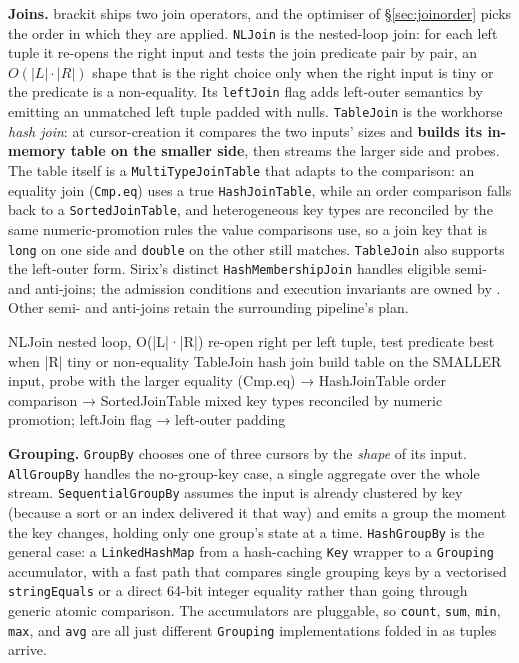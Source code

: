 \documentclass[11pt,a4paper,oneside]{report}
\newcommand{\dcap}[1]{\par\vspace{1pt}\noindent{\small\sffamily\bfseries\color{slate}#1}\par\vspace{-2pt}}
\theoremstyle{sirixthm}
\newcommand{\code}[1]{\texttt{#1}}
\begin{document}
\textbf{Joins.} brackit ships two join operators, and the optimiser of \S\ref{sec:joinorder} picks the
order in which they are applied. \code{NLJoin} is the nested-loop join: for each left tuple it re-opens
the right input and tests the join predicate pair by pair, an $O(\lvert L\rvert\cdot\lvert R\rvert)$ shape
that is the right choice only when the right input is tiny or the predicate is a non-equality. Its
\code{leftJoin} flag adds left-outer semantics by emitting an unmatched left tuple padded with nulls.
\code{TableJoin} is the workhorse \emph{hash join}: at cursor-creation it compares the two inputs' sizes
and \textbf{builds its in-memory table on the smaller side}, then streams the larger side and probes.
The table itself is a \code{MultiTypeJoinTable} that adapts to the comparison: an equality join
(\code{Cmp.eq}) uses a true \code{HashJoinTable}, while an order comparison falls back to a
\code{SortedJoinTable}, and heterogeneous key types are reconciled by the same numeric-promotion rules
the value comparisons use, so a join key that is \code{long} on one side and \code{double} on the other
still matches. \code{TableJoin} also supports the left-outer form. Sirix's distinct
\code{HashMembershipJoin} handles eligible semi- and anti-joins; the admission conditions and
execution invariants are owned by . Other semi- and
anti-joins retain the surrounding pipeline's plan.

\dcap{The two Brackit join operators and when each is chosen}
\begin{diagramS}
NLJoin     nested loop, O(|L|·|R|)   re-open right per left tuple, test predicate   best when |R| tiny or non-equality
TableJoin  hash join                 build table on the SMALLER input, probe with the larger
           equality (Cmp.eq)  → HashJoinTable        order comparison → SortedJoinTable
           mixed key types reconciled by numeric promotion;  leftJoin flag → left-outer padding
\end{diagramS}

\textbf{Grouping.} \code{GroupBy} chooses one of three cursors by the \emph{shape} of its input.
\code{AllGroupBy} handles the no-group-key case, a single aggregate over the whole stream.
\code{SequentialGroupBy} assumes the input is already clustered by key (because a sort or an index
delivered it that way) and emits a group the moment the key changes, holding only one group's state at a
time. \code{HashGroupBy} is the general case: a \code{LinkedHashMap} from a hash-caching \code{Key} wrapper
to a \code{Grouping} accumulator, with a fast path that compares single grouping keys by a vectorised
\code{stringEquals} or a direct 64-bit integer equality rather than going through generic atomic
comparison. The accumulators are pluggable, so \code{count}, \code{sum}, \code{min}, \code{max}, and
\code{avg} are all just different \code{Grouping} implementations folded in as tuples arrive.
\end{document}

